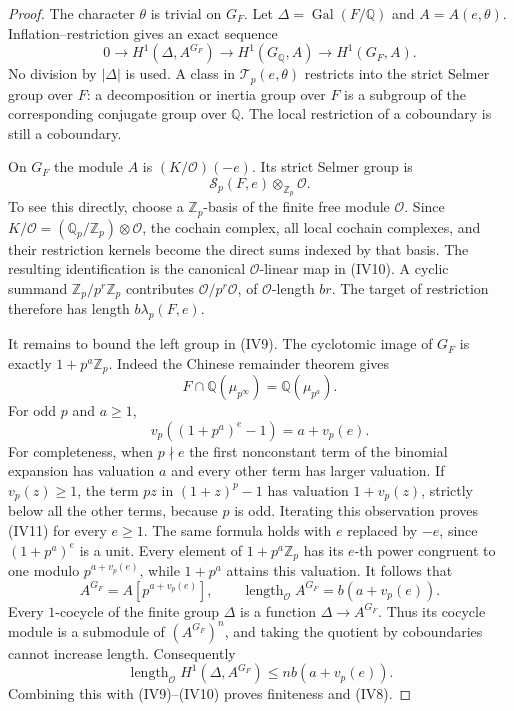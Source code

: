 \begin{proof}
The character $\theta$ is trivial on $G_F$. Let
$\Delta=\operatorname{Gal}(F/\mathbb Q)$ and
$A=A(e,\theta)$. Inflation--restriction gives an exact sequence
\[
 0\longrightarrow H^1(\Delta,A^{G_F})
 \longrightarrow H^1(G_{\mathbb Q},A)
 \longrightarrow H^1(G_F,A).
                                                               \tag{IV9}
\]
No division by $|\Delta|$ is used. A class in
$\mathcal T_p(e,\theta)$ restricts into the strict Selmer group
over $F$: a decomposition or inertia group over $F$ is a
subgroup of the corresponding conjugate group over $\mathbb Q$.
The local restriction of a coboundary is still a coboundary.

On $G_F$ the module $A$ is $(K/\mathcal O)(-e)$. Its strict
Selmer group is
\[
                       \mathcal S_p(F,e)\otimes_{\mathbb Z_p}
                                      \mathcal O.              \tag{IV10}
\]
To see this directly, choose a $\mathbb Z_p$-basis of the finite
free module $\mathcal O$. Since
$K/\mathcal O=(\mathbb Q_p/\mathbb Z_p)\otimes\mathcal O$,
the cochain complex, all local cochain complexes, and their
restriction kernels become the direct sums indexed by that
basis. The resulting identification is the canonical
$\mathcal O$-linear map in (IV10). A cyclic summand
$\mathbb Z_p/p^r\mathbb Z_p$ contributes
$\mathcal O/p^r\mathcal O$, of $\mathcal O$-length $br$.
The target of restriction therefore has length
$b\lambda_p(F,e)$.

It remains to bound the left group in (IV9). The cyclotomic
image of $G_F$ is exactly $1+p^a\mathbb Z_p$. Indeed the
Chinese remainder theorem gives
\[
 F\cap\mathbb Q(\mu_{p^\infty})=\mathbb Q(\mu_{p^a}).
\]
For odd $p$ and $a\ge1$,
\[
                   v_p((1+p^a)^e-1)=a+v_p(e).                 \tag{IV11}
\]
For completeness, when $p\nmid e$ the first nonconstant term
of the binomial expansion has valuation $a$ and every other
term has larger valuation. If $v_p(z)\ge1$, the term $pz$
in $(1+z)^p-1$ has valuation $1+v_p(z)$, strictly below
all the other terms, because $p$ is odd. Iterating this
observation proves (IV11) for every $e\ge1$.
The same formula holds with $e$ replaced by $-e$, since
$(1+p^a)^e$ is a unit. Every element of
$1+p^a\mathbb Z_p$ has its $e$-th power congruent to one
modulo $p^{a+v_p(e)}$, while $1+p^a$ attains this valuation.
It follows that
\[
 A^{G_F}=A[p^{a+v_p(e)}],\qquad
 \operatorname{length}_{\mathcal O}A^{G_F}=b(a+v_p(e)).
                                                               \tag{IV12}
\]
Every $1$-cocycle of the finite group $\Delta$ is a function
$\Delta\to A^{G_F}$. Thus its cocycle module is a submodule
of $(A^{G_F})^n$, and taking the quotient by coboundaries
cannot increase length. Consequently
\[
 \operatorname{length}_{\mathcal O}H^1(\Delta,A^{G_F})
                                  \le nb(a+v_p(e)).
\]
Combining this with (IV9)--(IV10) proves finiteness and (IV8).
\end{proof}

